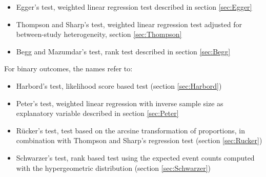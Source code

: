 \documentclass[11pt,a4paper,twoside]{book}\usepackage[]{graphicx}\usepackage[]{color}
\begin{document}
\begin{itemize}
\item Egger's test, weighted linear regression test described in section \ref{sec:Egger}
\item Thompson and Sharp's test, weighted linear regression test adjusted for between-study heterogeneity, section \ref{sec:Thompson}
\item Begg and Mazumdar's test, rank test described in section \ref{sec:Begg}
\end{itemize}

For binary outcomes, the names refer to:
\begin{itemize}
\item Harbord's test, likelihood score based test (section \ref{sec:Harbord})
\item Peter's test, weighted linear regression with inverse sample size as explanatory variable described in section \ref{sec:Peter}
\item R\"ucker's test, test based on the arcsine transformation of proportions, in combination with Thompson and Sharp's regression test (section \ref{sec:Rucker})
\item Schwarzer's test, rank based test using the expected event counts computed with the hypergeometric distribution (section \ref{sec:Schwarzer})
\end{itemize}
\end{document}
